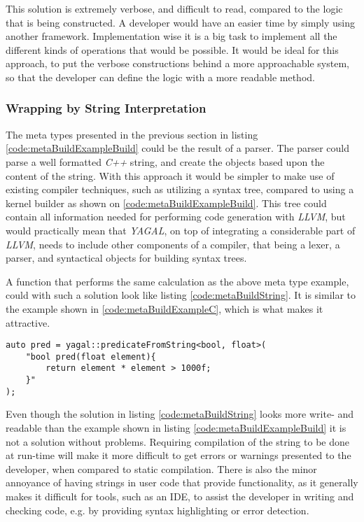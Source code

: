 This solution is extremely verbose, and difficult to read, compared to the logic that is being constructed. A developer would have an easier time by simply using another framework. Implementation wise it is a big task to implement all the different kinds of operations that would be possible. It would be ideal for this approach, to put the verbose constructions behind a more approachable system, so that the developer can define the logic with a more readable method.

\subsubsection{Wrapping by String Interpretation}
The meta types presented in the previous section in listing \ref{code:metaBuildExampleBuild} could be the result of a parser. The parser could parse a well formatted \textit{C++} string, and create the objects based upon the content of the string. With this approach it would be simpler to make use of existing compiler techniques, such as utilizing a syntax tree, compared to using a kernel builder as shown on \ref{code:metaBuildExampleBuild}. This tree could contain all information needed for performing  code generation with \textit{LLVM}, but would practically mean that \textit{YAGAL}, on top of integrating a considerable part of \textit{LLVM}, needs to include other components of a compiler, that being a lexer, a parser, and syntactical objects for building syntax trees.

A function that performs the same calculation as the above meta type example, could with such a solution look like listing \ref{code:metaBuildString}. It is similar to the example shown in \ref{code:metaBuildExampleC}, which is what makes it attractive. 

\begin{lstlisting}[caption={Code showing possible construction of device function with string interpretation.}, label={code:metaBuildString}]
auto pred = yagal::predicateFromString<bool, float>(
    "bool pred(float element){
        return element * element > 1000f;
    }"
);
\end{lstlisting}

Even though the solution in listing \ref{code:metaBuildString} looks more write- and readable than the example shown in listing \ref{code:metaBuildExampleBuild} it is not a solution without problems. Requiring compilation of the string to be done at run-time will make it more difficult to get errors or warnings presented to the developer, when compared to static compilation. There is also the minor annoyance of having strings in user code that provide functionality, as it generally makes it difficult for tools, such as an IDE, to assist the developer in writing and checking code, e.g. by providing syntax highlighting or error detection.

